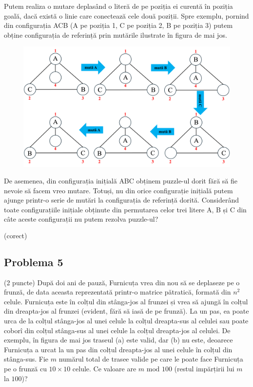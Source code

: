\documentclass{exam}
\begin{document}
Putem realiza o mutare deplasând o literă de pe poziția ei curentă în poziția goală, dacă există o linie care conectează cele două poziții. Spre exemplu, pornind din configurația ACB (A pe poziția 1, C pe poziția 2, B pe poziția 3) putem obține configurația de referință prin mutările ilustrate în figura de mai jos.

\begin{figure}[h]
\includegraphics[scale=0.45]{mutare_ABC_config_finala.png}
\centering
\end{figure}

De asemenea, din configurația inițială ABC obținem puzzle-ul dorit fără să fie nevoie să facem vreo mutare. Totuși, nu din orice configurație inițială putem ajunge printr-o serie de mutări la configurația de referință dorită. Considerând toate configurațiile inițiale obținute din permutarea celor trei litere A, B și C din câte aceste configurații nu putem rezolva puzzle-ul?


\begin{oneparchoices}
  (corect)
\end{oneparchoices}

\newpage

\subsection*{Problema 5}

(2 puncte)  După doi ani de pauză, Furnicuța vrea din nou să se deplaseze pe o frunză, de data aceasta reprezentată printr-o matrice pătratică, formată din $n^2$ celule. Furnicuța este în colțul din stânga-jos al frunzei și vrea să ajungă în colțul din dreapta-jos al frunzei (evident, fără să iasă de pe frunză). La un pas,
ea poate urca de la colțul stânga-jos al unei celule la colțul dreapta-sus al celulei sau poate coborî din colțul stânga-sus al unei celule la colțul dreapta-jos al celulei.
 De exemplu, în figura de mai jos traseul (a) este valid, dar (b) nu este, deoarece Furnicuța a urcat la un pas din colțul dreapta-jos al unei celule în colțul din stânga-sus. Fie $m$ numărul total de  trasee valide pe care le poate face Furnicuța pe o frunză cu $10 \times 10$  celule. Ce valoare are $ m \mbox{ mod }  100$ (restul impărțirii lui $m$ la $100$)?
\end{document}
